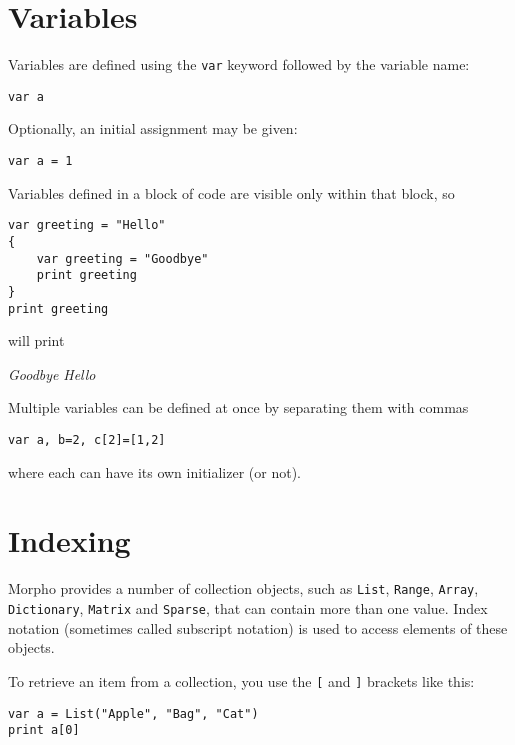 \hypertarget{variables}{%
\section{Variables}\label{variables}}

Variables are defined using the \texttt{var} keyword followed by the
variable name:

\begin{lstlisting}
var a
\end{lstlisting}

Optionally, an initial assignment may be given:

\begin{lstlisting}
var a = 1
\end{lstlisting}

Variables defined in a block of code are visible only within that block,
so

\begin{lstlisting}
var greeting = "Hello"
{
    var greeting = "Goodbye"
    print greeting
}
print greeting
\end{lstlisting}

will print

\emph{Goodbye} \emph{Hello}

Multiple variables can be defined at once by separating them with commas

\begin{lstlisting}
var a, b=2, c[2]=[1,2]
\end{lstlisting}

where each can have its own initializer (or not).

\hypertarget{indexing}{%
\section{Indexing}\label{indexing}}

Morpho provides a number of collection objects, such as \texttt{List},
\texttt{Range}, \texttt{Array}, \texttt{Dictionary}, \texttt{Matrix} and
\texttt{Sparse}, that can contain more than one value. Index notation
(sometimes called subscript notation) is used to access elements of
these objects.

To retrieve an item from a collection, you use the \texttt{{[}} and
\texttt{{]}} brackets like this:

\begin{lstlisting}
var a = List("Apple", "Bag", "Cat")
print a[0]
\end{lstlisting}

